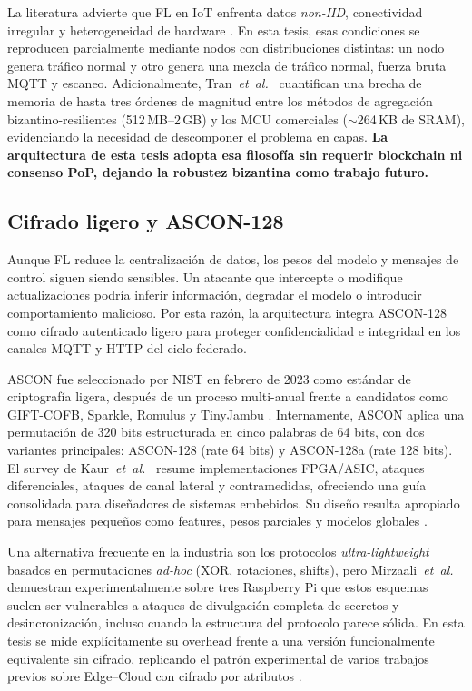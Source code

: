 La literatura advierte que FL en IoT enfrenta datos \textit{non-IID}, conectividad irregular y heterogeneidad de hardware \cite{Albanbay2025, Ramadan2025}. En esta tesis, esas condiciones se reproducen parcialmente mediante nodos con distribuciones distintas: un nodo genera tráfico normal y otro genera una mezcla de tráfico normal, fuerza bruta MQTT y escaneo. Adicionalmente, Tran~\textit{et~al.}~\cite{Tran2026_EdgeTrustShard} cuantifican una brecha de memoria de hasta tres órdenes de magnitud entre los métodos de agregación bizantino-resilientes (512\,MB--2\,GB) y los MCU comerciales ($\sim$264\,KB de SRAM), evidenciando la necesidad de descomponer el problema en capas. \textbf{La arquitectura de esta tesis adopta esa filosofía sin requerir blockchain ni consenso PoP, dejando la robustez bizantina como trabajo futuro.}

\subsection{Cifrado ligero y ASCON-128}
Aunque FL reduce la centralización de datos, los pesos del modelo y mensajes de control siguen siendo sensibles. Un atacante que intercepte o modifique actualizaciones podría inferir información, degradar el modelo o introducir comportamiento malicioso. Por esta razón, la arquitectura integra ASCON-128 como cifrado autenticado ligero para proteger confidencialidad e integridad en los canales MQTT y HTTP del ciclo federado.

ASCON fue seleccionado por NIST en febrero de 2023 como estándar de criptografía ligera, después de un proceso multi-anual frente a candidatos como GIFT-COFB, Sparkle, Romulus y TinyJambu \cite{NISTSP8002322025, Kaur2025_ASCON_Survey}. Internamente, ASCON aplica una permutación de 320 bits estructurada en cinco palabras de 64 bits, con dos variantes principales: ASCON-128 (rate 64 bits) y ASCON-128a (rate 128 bits). El survey de Kaur~\textit{et~al.}~\cite{Kaur2025_ASCON_Survey} resume implementaciones FPGA/ASIC, ataques diferenciales, ataques de canal lateral y contramedidas, ofreciendo una guía consolidada para diseñadores de sistemas embebidos. Su diseño resulta apropiado para mensajes pequeños como features, pesos parciales y modelos globales \cite{NISTSP8002322025, Gusita2025_LWC_Survey}.

Una alternativa frecuente en la industria son los protocolos \emph{ultra-lightweight} basados en permutaciones \emph{ad-hoc} (XOR, rotaciones, shifts), pero Mirzaali~\textit{et~al.}~\cite{Mirzaali2025_LWC_Permutations} demuestran experimentalmente sobre tres Raspberry Pi que estos esquemas suelen ser vulnerables a ataques de divulgación completa de secretos y desincronización, incluso cuando la estructura del protocolo parece sólida. En esta tesis se mide explícitamente su overhead frente a una versión funcionalmente equivalente sin cifrado, replicando el patrón experimental de varios trabajos previos sobre Edge--Cloud con cifrado por atributos \cite{SaravanaBalaji2023_EdgeIoT_DL}.

